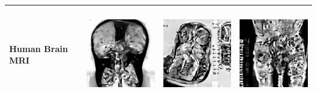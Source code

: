 \begin{table}[H]
\begin{tabularx}{\linewidth}{@{}>{\centering\arraybackslash}m{3cm}>{\centering\arraybackslash}X>{\centering\arraybackslash}X>{\centering\arraybackslash}X@{}}
Human Brain MRI & \includegraphics[valign=M,width=\linewidth,height=4cm,keepaspectratio]{main/content/images/sd_textual_inversion/brain_tumor/ti.jpeg} & \includegraphics[valign=M,width=\linewidth,height=4cm,keepaspectratio]{main/content/images/sd_textual_inversion/brain_tumor/ti2.jpeg} & \includegraphics[valign=M,width=\linewidth,height=4cm,keepaspectratio]{main/content/images/sd_textual_inversion/brain_tumor/ti3.jpeg} \\
\midrule

\end{tabularx}
\end{table}
